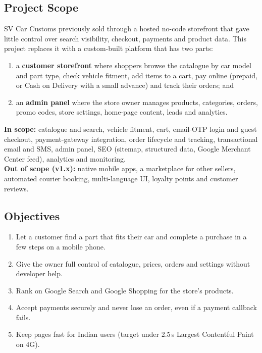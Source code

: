 \documentclass[11pt,a4paper]{article}
\begin{document}
\subsection{Project Scope}
SV Car Customs previously sold through a hosted no-code storefront that gave little
control over search visibility, checkout, payments and product data. This project
replaces it with a custom-built platform that has two parts:
\begin{enumerate}
  \item a \textbf{customer storefront} where shoppers browse the catalogue by car model
        and part type, check vehicle fitment, add items to a cart, pay online (prepaid,
        or Cash on Delivery with a small advance) and track their orders; and
  \item an \textbf{admin panel} where the store owner manages products, categories,
        orders, promo codes, store settings, home-page content, leads and analytics.
\end{enumerate}
\textbf{In scope:} catalogue and search, vehicle fitment, cart, email-OTP login and guest
checkout, payment-gateway integration, order lifecycle and tracking, transactional
email and SMS, admin panel, SEO (sitemap, structured data, Google Merchant Center
feed), analytics and monitoring.\\
\textbf{Out of scope (v1.x):} native mobile apps, a marketplace for other sellers,
automated courier booking, multi-language UI, loyalty points and customer reviews.

\subsection{Objectives}
\begin{enumerate}
  \item Let a customer find a part that fits their car and complete a purchase in a
        few steps on a mobile phone.
  \item Give the owner full control of catalogue, prices, orders and settings without
        developer help.
  \item Rank on Google Search and Google Shopping for the store's products.
  \item Accept payments securely and never lose an order, even if a payment callback
        fails.
  \item Keep pages fast for Indian users (target under 2.5\,s Largest Contentful Paint
        on 4G).
\end{enumerate}
\end{document}
